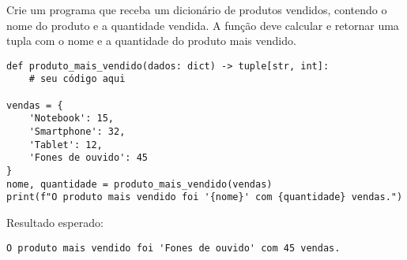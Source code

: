Crie um programa que receba um dicionário de produtos vendidos, contendo o nome do produto e a quantidade vendida.
A função deve calcular e retornar uma tupla com o nome e a quantidade do produto mais vendido.
\begin{verbatim}
def produto_mais_vendido(dados: dict) -> tuple[str, int]:
    # seu código aqui

vendas = {
    'Notebook': 15,
    'Smartphone': 32,
    'Tablet': 12,
    'Fones de ouvido': 45
}
nome, quantidade = produto_mais_vendido(vendas)
print(f"O produto mais vendido foi '{nome}' com {quantidade} vendas.")
\end{verbatim}

Resultado esperado:
\begin{verbatim}
O produto mais vendido foi 'Fones de ouvido' com 45 vendas.
\end{verbatim}
